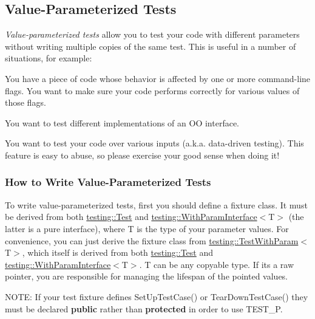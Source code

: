 \subsection*{Value-\/\+Parameterized Tests}

{\itshape Value-\/parameterized tests} allow you to test your code with different parameters without writing multiple copies of the same test. This is useful in a number of situations, for example\+:


\begin{DoxyItemize}
\item You have a piece of code whose behavior is affected by one or more command-\/line flags. You want to make sure your code performs correctly for various values of those flags.
\item You want to test different implementations of an OO interface.
\item You want to test your code over various inputs (a.\+k.\+a. data-\/driven testing). This feature is easy to abuse, so please exercise your good sense when doing it!
\end{DoxyItemize}

\subsubsection*{How to Write Value-\/\+Parameterized Tests}

To write value-\/parameterized tests, first you should define a fixture class. It must be derived from both {\ttfamily \hyperlink{classtesting_1_1Test}{testing\+::\+Test}} and {\ttfamily \hyperlink{classtesting_1_1WithParamInterface}{testing\+::\+With\+Param\+Interface}$<$T$>$} (the latter is a pure interface), where {\ttfamily T} is the type of your parameter values. For convenience, you can just derive the fixture class from {\ttfamily \hyperlink{classtesting_1_1TestWithParam}{testing\+::\+Test\+With\+Param}$<$T$>$}, which itself is derived from both {\ttfamily \hyperlink{classtesting_1_1Test}{testing\+::\+Test}} and {\ttfamily \hyperlink{classtesting_1_1WithParamInterface}{testing\+::\+With\+Param\+Interface}$<$T$>$}. {\ttfamily T} can be any copyable type. If it\textquotesingle{}s a raw pointer, you are responsible for managing the lifespan of the pointed values.

N\+O\+TE\+: If your test fixture defines {\ttfamily Set\+Up\+Test\+Case()} or {\ttfamily Tear\+Down\+Test\+Case()} they must be declared {\bfseries public} rather than {\bfseries protected} in order to use {\ttfamily T\+E\+S\+T\+\_\+P}.



